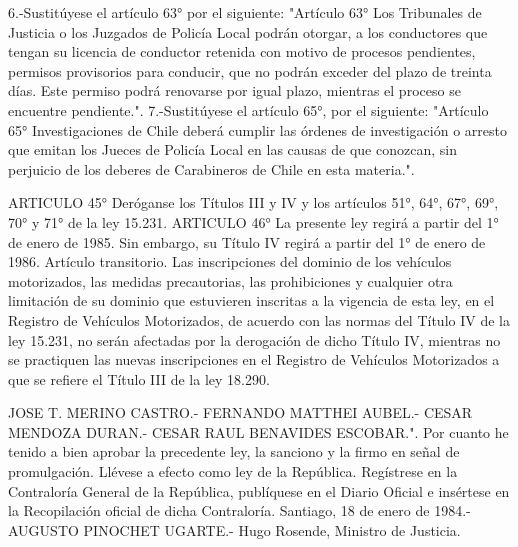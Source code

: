     6.-Sustitúyese el artículo 63° por el siguiente:
    "Artículo 63° Los Tribunales de Justicia o los Juzgados de Policía Local podrán otorgar, a los conductores que tengan su licencia de conductor retenida con motivo de procesos pendientes, permisos provisorios para conducir, que no podrán exceder del plazo de treinta días.
    Este permiso podrá renovarse por igual plazo, mientras el proceso se encuentre pendiente.".
    7.-Sustitúyese el artículo 65°, por el siguiente:
    "Artículo 65° Investigaciones de Chile deberá cumplir las órdenes de investigación o arresto que emitan los Jueces de Policía Local en las causas de que conozcan, sin perjuicio de los deberes de Carabineros de Chile en esta materia.".

    ARTICULO 45° Deróganse los Títulos III y IV y los artículos 51°, 64°, 67°, 69°, 70° y 71° de la ley 15.231.
    ARTICULO 46° La presente ley regirá a partir del 1° de enero de 1985. Sin embargo, su Título IV regirá a partir del 1° de enero de 1986.
    Artículo transitorio. Las inscripciones del dominio de los vehículos motorizados, las medidas precautorias, las prohibiciones y cualquier otra limitación de su dominio que estuvieren inscritas a la vigencia de esta ley, en el Registro de Vehículos Motorizados, de acuerdo con las normas del Título IV de la ley 15.231, no serán afectadas por la derogación de dicho Título IV, mientras no se practiquen las nuevas inscripciones en el Registro de Vehículos Motorizados a que se refiere el Título III de la ley 18.290.

    JOSE T. MERINO CASTRO.- FERNANDO MATTHEI AUBEL.- CESAR MENDOZA DURAN.- CESAR RAUL BENAVIDES ESCOBAR.".
    Por cuanto he tenido a bien aprobar la precedente ley, la sanciono y la firmo en señal de promulgación.
    Llévese a efecto como ley de la República.
    Regístrese en la Contraloría General de la República, publíquese en el Diario Oficial e insértese en la Recopilación oficial de dicha Contraloría.
    Santiago, 18 de enero de 1984.- AUGUSTO PINOCHET UGARTE.- Hugo Rosende, Ministro de Justicia.
